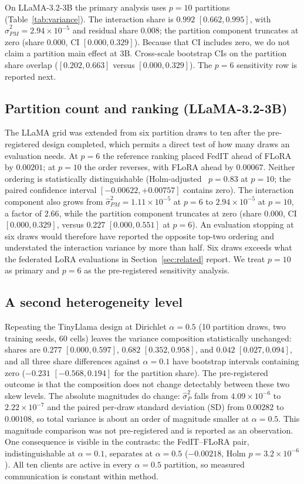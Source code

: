 On LLaMA-3.2-3B the primary analysis uses $p{=}10$ partitions (Table~\ref{tab:variance}). The interaction share is $0.992$ $[0.662,0.995]$, with $\hat\sigma^2_{PM}{=}2.94{\times}10^{-5}$ and residual share $0.008$; the partition component truncates at zero (share $0.000$, CI $[0.000,0.329]$). Because that CI includes zero, we do not claim a partition main effect at 3B. Cross-scale bootstrap CIs on the partition share overlap ($[0.202,0.663]$ versus $[0.000,0.329]$). The $p{=}6$ sensitivity row is reported next.

\subsection{Partition count and ranking (LLaMA-3.2-3B)}
The LLaMA grid was extended from six partition draws to ten after the pre-registered
design completed, which permits a direct test of how many draws an evaluation needs.
At $p{=}6$ the reference ranking placed FedIT ahead of FLoRA by $0.00201$; at $p{=}10$
the order reverses, with FLoRA ahead by $0.00067$. Neither ordering is statistically
distinguishable (Holm-adjusted~\cite{holm1979sequential} $p{=}0.83$ at $p{=}10$; the paired confidence interval
$[-0.00622, +0.00757]$ contains zero). The interaction component also grows from
$\hat\sigma^2_{PM}{=}1.11{\times}10^{-5}$ at $p{=}6$ to $2.94{\times}10^{-5}$ at
$p{=}10$, a factor of $2.66$, while the partition component truncates at zero
(share $0.000$, CI $[0.000, 0.329]$, versus $0.227$ $[0.000, 0.551]$ at $p{=}6$).
An evaluation stopping at six draws would therefore have reported the opposite
top-two ordering and understated the interaction variance by more than half. Six
draws exceeds what the federated LoRA evaluations in Section~\ref{sec:related} report.
We treat $p{=}10$ as primary and $p{=}6$ as the pre-registered sensitivity analysis.

\subsection{A second heterogeneity level}
Repeating the TinyLlama design at Dirichlet $\alpha{=}0.5$ (10 partition draws, two
training seeds, 60 cells) leaves the variance composition statistically unchanged:
shares are $0.277$ $[0.000, 0.597]$, $0.682$ $[0.352, 0.958]$, and $0.042$
$[0.027, 0.094]$, and all three share differences against $\alpha{=}0.1$ have
bootstrap intervals containing zero ($-0.231$ $[-0.568, 0.194]$ for the partition
share). The pre-registered outcome is that the composition does not change detectably
between these two skew levels. The absolute magnitudes do change: $\hat\sigma^2_P$
falls from $4.09{\times}10^{-6}$ to $2.22{\times}10^{-7}$ and the paired per-draw standard deviation (SD)
from $0.00282$ to $0.00108$, so total variance is about an order of magnitude smaller
at $\alpha{=}0.5$. This magnitude comparison was not pre-registered and is reported as
an observation. One consequence is visible in the contrasts: the FedIT--FLoRA pair,
indistinguishable at $\alpha{=}0.1$, separates at $\alpha{=}0.5$ ($-0.00218$,
Holm $p{=}3.2{\times}10^{-6}$). All ten clients are active in every $\alpha{=}0.5$
partition, so measured communication is constant within method.

